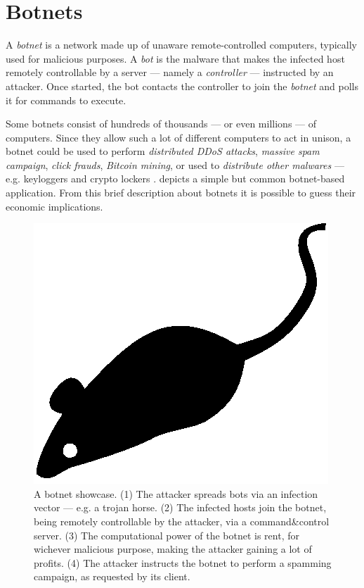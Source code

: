 \section{Botnets}
\label{sec:botnets}

A \textit{botnet} is a network made up of unaware remote-controlled computers, typically used for malicious purposes.
A \textit{bot} is the malware that makes the infected host remotely controllable by a server — namely a \textit{controller} — instructed by an attacker. Once started, the bot contacts the controller to join the \textit{botnet} and polls it for commands to execute.

Some botnets consist of hundreds of thousands — or even millions — of computers. Since they allow such a lot of different computers to act in unison, a botnet could be used to perform \textit{distributed DDoS attacks}, \textit{massive spam campaign}, \textit{click frauds}, \textit{Bitcoin mining}, or used to \textit{distribute other malwares} — e.g. keyloggers and crypto lockers \cite{anderson2008security}.  depicts a simple but common botnet-based application. From this brief description about botnets it is possible to guess their economic implications.

\begin{figure}[tp]
  \centering
  \includegraphics{./fig/acmlarge-mouse}
  \caption{A botnet showcase. (1) The attacker spreads bots via an infection vector — e.g. a trojan horse. (2) The infected hosts join the botnet, being remotely controllable by the attacker, via a command\&control server. (3) The computational power of the botnet is rent, for wichever malicious purpose, making the attacker gaining a lot of profits. (4) The attacker instructs the botnet to perform a spamming campaign, as requested by its client.}
    \label{fig:botnet-showcase}
\end{figure}

